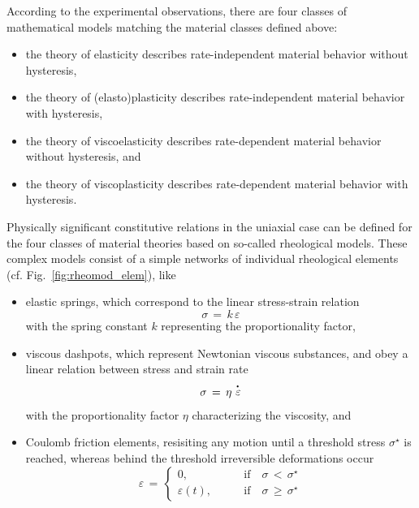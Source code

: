 According to the experimental observations, there are four classes of mathematical models matching the material classes defined above:
\begin{itemize}
\item the theory of elasticity describes rate-independent material behavior without hysteresis,
\item the theory of (elasto)plasticity describes rate-independent material behavior with hysteresis,
\item the theory of viscoelasticity describes rate-dependent material behavior without hysteresis, and
\item the theory of viscoplasticity describes rate-dependent material behavior with hysteresis.
\end{itemize}

Physically significant constitutive relations in the uniaxial case can be defined for the four classes of material theories based on so-called rheological models. These complex models consist of a simple networks of individual rheological elements (cf. Fig.~\ref{fig:rheomod_elem}), like
\begin{itemize}
\item elastic springs, which correspond to the linear stress-strain relation
\begin{equation}
\sigma\,=\,k\,\varepsilon
\end{equation}
with the spring constant $k$ representing the proportionality factor,  
\item viscous dashpots, which represent Newtonian viscous substances, and obey a linear relation between stress and strain rate
\begin{equation}
\sigma\,=\,\eta\,\mathop{\varepsilon}\limits^{\mbox{${\mbox{\boldmath${.}$\unboldmath}}_{\:\!}$}}
\end{equation}
with the proportionality factor $\eta$ characterizing the viscosity, and
\item Coulomb friction elements, resisiting any motion until a threshold stress $\sigma^{\star}$ is reached, whereas behind the threshold irreversible deformations occur
\begin{equation}
\varepsilon\,=\,
\left\{
\begin{array}{ll}
0,              & \qquad\mbox{if}\quad\sigma\,<\,\sigma^{\star}  \\[1.5ex]
\varepsilon(t), & \qquad\mbox{if}\quad\sigma\,\geq\,\sigma^{\star}
\end{array}
\right.
\end{equation}
\end{itemize}

